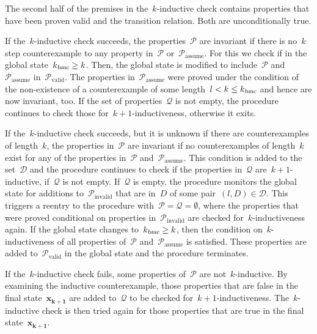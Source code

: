 \documentclass[12pt]{article}
\renewcommand{\textproc}{\textsl}
\renewcommand{\vec}[1]{\mathbf{#1}}            %
\begin{document}
The second half of the premises in the~$k$\nobreakdash-inductive check contains properties that have been proven valid and the transition relation. Both are unconditionally true.

If the~$k$\nobreakdash-inductive check succeeds, the properties~$\mathcal{P}$ are invariant if there is no~$k$ step counterexample to any property in~$\mathcal{P}$ or~$\mathcal{P}_\mathrm{assume}$. For this we check if in the global state~${k_\textproc{bmc}\geq k}$. Then, the global state is modified to include~$\mathcal{P}$ and~$\mathcal{P}_\mathrm{assume}$ in~$\mathcal{P}_\mathrm{valid}$. The properties in~$\mathcal{P}_\mathrm{assume}$ were proved under the condition of the non-existence of a counterexample of some length~${l < k \leq k_\textproc{bmc}}$ and hence are now invariant, too. If the set of properties~$\mathcal{Q}$ is not empty, the procedure continues to check those for~${k+1}$\nobreakdash-in\-duct\-ive\-ness, otherwise it exits.

If the~$k$\nobreakdash-inductive check succeeds, but it is unknown if there are counterexamples of length~$k$, the properties in~$\mathcal{P}$ are invariant if no counterexamples of length~$k$ exist for any of the properties in~$\mathcal{P}$ and~$\mathcal{P}_\mathrm{assume}$. This condition is added to the set~$\mathcal{D}$ and the procedure continues to check if the properties in~$\mathcal{Q}$ are~${k+1}$\nobreakdash-inductive, if~$\mathcal{Q}$ is not empty. If~$\mathcal{Q}$ is empty, the procedure monitors the global state for additions to~$\mathcal{P}_\mathrm{invalid}$ that are in~$D$ of some pair~${(l,D)\in\mathcal{D}}$. This triggers a reentry to the procedure with~${\mathcal{P}=\mathcal{Q}=\emptyset}$, where the properties that were proved conditional on properties in~$\mathcal{P}_\mathrm{invalid}$ are checked for~$k$\nobreakdash-inductiveness again. If the global state changes to~$k_\textproc{bmc} \geq k$, then the condition on~$k$\nobreakdash-inductiveness of all properties of~$\mathcal{P}$ and~$\mathcal{P}_\mathrm{assume}$ is satisfied. These properties are added to~$\mathcal{P}_\mathrm{valid}$ in the global state and the procedure terminates.

If the~$k$\nobreakdash-inductive check fails, some properties of~$\mathcal{P}$ are not~$k$\nobreakdash-inductive. By examining the inductive counterexample, those properties that are false in the final state~$\vec{x_{k+1}}$ are added to~$\mathcal{Q}$ to be checked for~${k+1}$\nobreakdash-inductiveness. The~$k$\nobreakdash-inductive check is then tried again for those properties that are true in the final state~$\vec{x_{k+1}}$.

  
\end{document}
